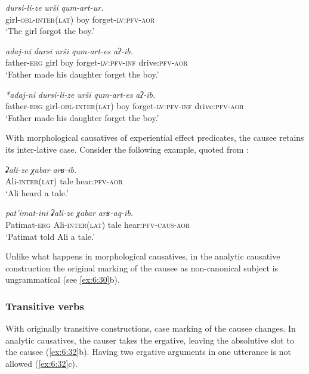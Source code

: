 ﻿\documentclass[output=paper]{langsci/langscibook}
\begin{document}
\ea \label{ex:6:30} %
\ea %
\gll \emph{dursi-li-ze} \emph{urši} \emph{qum-art-ur.}\\
girl-\textsc{obl}-\textsc{inter}(\textsc{lat}) boy forget-\textsc{lv}:\textsc{pfv}-\textsc{aor}\\
\glt `The girl forgot the boy.'

\ex %
\gll \emph{adaj-ni} \emph{dursi} \emph{urši} \emph{qum-art-es} \emph{aʔ-ib.}\\
father-\textsc{erg} girl boy forget-\textsc{lv}:\textsc{pfv}-\textsc{inf} drive:\textsc{pfv}-\textsc{aor}\\
\glt `Father made his daughter forget the boy.'

\ex %
\gll \emph{*adaj-ni} \emph{dursi-li-ze} \emph{urši} \emph{qum-art-es} \emph{aʔ-ib.}\\
father-\textsc{erg} girl-\textsc{obl}-\textsc{inter}(\textsc{lat}) boy forget-\textsc{lv}:\textsc{pfv}-\textsc{inf} drive:\textsc{pfv}-\textsc{aor}\\
\glt `Father made his daughter forget the boy.'
\z
\z

With morphological causatives of experiential effect predicates, the
causee retains its inter-lative case. Consider the following
example, quoted from \citet[8]{ageeva2014}:

\ea %
\ea %
\gll \emph{ʡali-ze} \emph{χabar} \emph{arʁ-ib.}\\
Ali-\textsc{inter}(\textsc{lat}) tale hear:\textsc{pfv}-\textsc{aor}\\
\glt `Ali heard a tale.'

\ex %
\gll \emph{pat'imat-ini} \emph{ʡali-ze}  \emph{χabar} \emph{arʁ-aq-ib.}\\
Patimat-\textsc{erg} Ali-\textsc{inter}(\textsc{lat}) tale hear:\textsc{pfv}-\textsc{caus}-\textsc{aor}\\
\glt `Patimat told Ali a tale.'
\z
\z

Unlike what happens in morphological causatives, in the analytic causative
construction the original marking of the causee as non-canonical subject
is ungrammatical (see \ref{ex:6:30}b).
%

\subsubsection{Transitive verbs}


With originally transitive constructions, case marking of the causee
changes. In analytic causatives, the causer takes the ergative, leaving
the absolutive slot to the causee (\ref{ex:6:32}b). Having two ergative arguments
in one utterance is not allowed (\ref{ex:6:32}c).
\end{document}
